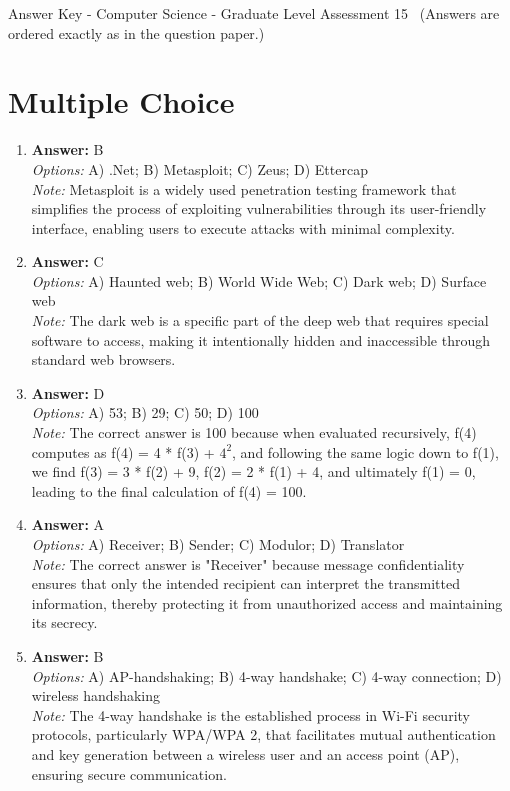 \documentclass[12pt]{article}
\begin{document}
\begin{center}
Answer Key - Computer Science - Graduate Level Assessment 15 \
\small (Answers are ordered exactly as in the question paper.)
\end{center}

\section*{Multiple Choice}
\begin{enumerate}[label=\arabic*.]
\item \textbf{Answer:} B
\\ \textit{Options:} A) .Net; B) Metasploit; C) Zeus; D) Ettercap
\\ \textit{Note:} Metasploit is a widely used penetration testing framework that simplifies the process of exploiting vulnerabilities through its user-friendly interface, enabling users to execute attacks with minimal complexity.
\item \textbf{Answer:} C
\\ \textit{Options:} A) Haunted web; B) World Wide Web; C) Dark web; D) Surface web
\\ \textit{Note:} The dark web is a specific part of the deep web that requires special software to access, making it intentionally hidden and inaccessible through standard web browsers.
\item \textbf{Answer:} D
\\ \textit{Options:} A) 53; B) 29; C) 50; D) 100
\\ \textit{Note:} The correct answer is 100 because when evaluated recursively, f(4) computes as f(4) = 4 * f(3) + $4^2$, and following the same logic down to f(1), we find f(3) = 3 * f(2) + 9, f(2) = 2 * f(1) + 4, and ultimately f(1) = 0, leading to the final calculation of f(4) = 100.
\item \textbf{Answer:} A
\\ \textit{Options:} A) Receiver; B) Sender; C) Modulor; D) Translator
\\ \textit{Note:} The correct answer is "Receiver" because message confidentiality ensures that only the intended recipient can interpret the transmitted information, thereby protecting it from unauthorized access and maintaining its secrecy.
\item \textbf{Answer:} B
\\ \textit{Options:} A) AP-handshaking; B) 4-way handshake; C) 4-way connection; D) wireless handshaking
\\ \textit{Note:} The 4-way handshake is the established process in Wi-Fi security protocols, particularly WPA/WPA 2, that facilitates mutual authentication and key generation between a wireless user and an access point (AP), ensuring secure communication.
\end{enumerate}
\end{document}
